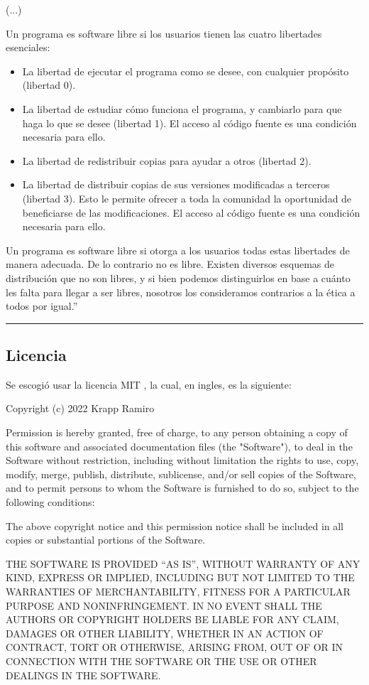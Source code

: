 \documentclass[../informe_krapp.tex]{subfiles}
\begin{document}
(...)

Un programa es software libre si los usuarios tienen las cuatro libertades esenciales:
\begin{itemize}
	\item La libertad de ejecutar el programa como se desee, con cualquier propósito (libertad 0).
	\item La libertad de estudiar cómo funciona el programa, y cambiarlo para que haga lo que se desee (libertad 1). El acceso al código fuente es una condición necesaria para ello.
	\item La libertad de redistribuir copias para ayudar a otros (libertad 2).
	\item La libertad de distribuir copias de sus versiones modificadas a terceros (libertad 3). Esto le permite ofrecer a toda la comunidad la oportunidad de beneficiarse de las modificaciones. El acceso al código fuente es una condición necesaria para ello.
\end{itemize}

Un programa es software libre si otorga a los usuarios todas estas libertades de manera adecuada. De lo contrario no es libre. Existen diversos esquemas de distribución que no son libres, y si bien podemos distinguirlos en base a cuánto les falta para llegar a ser libres, nosotros los consideramos contrarios a la ética a todos por igual.''
\begin{center}
	\rule{0.8\textwidth}{0.3pt}
\end{center}

\clearpage

\subsection{Licencia}
Se escogió usar la licencia MIT \cite{mit}, la cual, en ingles, es la siguiente:

Copyright (c) 2022 Krapp Ramiro

Permission is hereby granted, free of charge, to any person obtaining a copy
of this software and associated documentation files (the "Software"), to deal
in the Software without restriction, including without limitation the rights
to use, copy, modify, merge, publish, distribute, sublicense, and/or sell
copies of the Software, and to permit persons to whom the Software is
furnished to do so, subject to the following conditions:

The above copyright notice and this permission notice shall be included in all
copies or substantial portions of the Software.

THE SOFTWARE IS PROVIDED ``AS IS'', WITHOUT WARRANTY OF ANY KIND, EXPRESS OR
IMPLIED, INCLUDING BUT NOT LIMITED TO THE WARRANTIES OF MERCHANTABILITY,
FITNESS FOR A PARTICULAR PURPOSE AND NONINFRINGEMENT. IN NO EVENT SHALL THE
AUTHORS OR COPYRIGHT HOLDERS BE LIABLE FOR ANY CLAIM, DAMAGES OR OTHER
LIABILITY, WHETHER IN AN ACTION OF CONTRACT, TORT OR OTHERWISE, ARISING FROM,
OUT OF OR IN CONNECTION WITH THE SOFTWARE OR THE USE OR OTHER DEALINGS IN THE
SOFTWARE.
\end{document}
